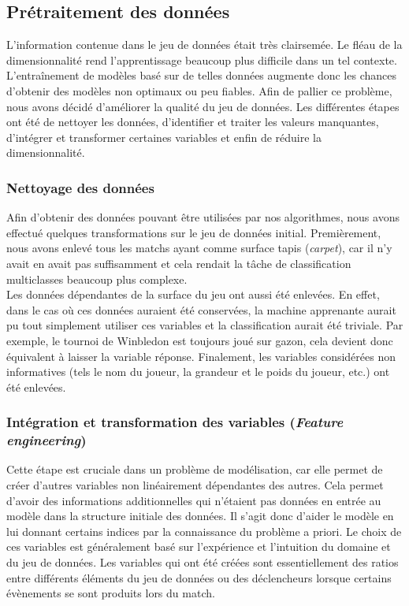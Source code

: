 \subsection{Prétraitement des données}
L'information contenue dans le jeu de données était très clairsemée. Le fléau de la dimensionnalité rend l'apprentissage beaucoup plus difficile dans un tel contexte. L'entraînement de modèles basé sur de telles données augmente donc les chances d'obtenir des modèles non optimaux ou peu fiables. Afin de pallier ce problème, nous avons décidé d'améliorer la qualité du jeu de données. Les différentes étapes ont été de nettoyer les données, d'identifier et traiter les valeurs manquantes, d'intégrer et transformer certaines variables et enfin de réduire la dimensionnalité.

\subsubsection{Nettoyage des données}
Afin d'obtenir des données pouvant être utilisées par nos algorithmes, nous avons effectué quelques transformations sur le jeu de données initial. Premièrement, nous avons enlevé tous les matchs ayant comme surface tapis (\textit{carpet}), car il n'y avait en avait pas suffisamment et cela rendait la tâche de classification multiclasses beaucoup plus complexe. \\

 Les données dépendantes de la surface du jeu ont aussi été enlevées. En effet, dans le cas où ces données auraient été conservées, la machine apprenante aurait pu tout simplement utiliser ces variables et la classification aurait été triviale. Par exemple, le tournoi de Winbledon est toujours joué sur gazon, cela devient donc équivalent à laisser la variable réponse. Finalement, les variables considérées non informatives (tels le nom du joueur, la grandeur et le poids du joueur, etc.) ont été enlevées.

\subsubsection{Intégration et transformation des variables (\textit{Feature engineering})}
Cette étape est cruciale dans un problème de modélisation, car elle permet de créer d'autres variables non linéairement dépendantes des autres. Cela permet d'avoir des informations additionnelles qui n'étaient pas données en entrée au modèle dans la structure initiale des données. Il s'agit donc d'aider le modèle en lui donnant certains indices par la connaissance du problème a priori. Le choix de ces variables est généralement basé sur l'expérience et l'intuition du domaine et du jeu de données. Les variables qui ont été créées sont essentiellement des ratios entre différents éléments du jeu de données ou des déclencheurs lorsque certains évènements se sont produits lors du match.\\

